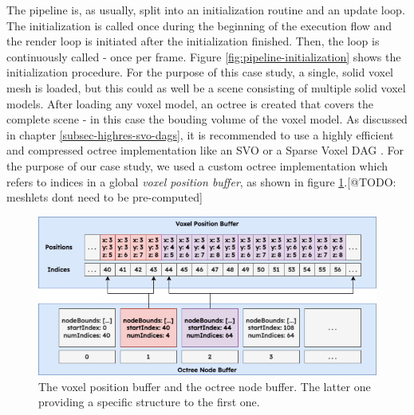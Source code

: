 The pipeline is, as usually, split into an initialization routine and an update loop. The initialization is 
called once during the beginning of the execution flow and the render loop is initiated after the initialization 
finished. Then, the loop is continuously called - once per frame. Figure \ref{fig:pipeline-initialization} shows 
the initialization procedure. For the purpose of this case study, a single, solid voxel mesh is loaded, but this 
could as well be a scene consisting of multiple solid voxel models. After loading any voxel model, an octree is 
created that covers the complete scene - in this case the bouding volume of the voxel model. As discussed in 
chapter \ref{subsec-highres-svo-dags}, it is recommended to use a highly efficient and compressed octree 
implementation like an \ac{SVO} or a Sparse Voxel \ac{DAG} \cite{Kampe2013}. For the purpose of our case study, 
we used a custom octree implementation which refers to indices in a global \emph{voxel position buffer}, as 
shown in figure \ref{fig:voxelpos-octreenode-buffer}.[@TODO: meshlets dont need to be pre-computed] \\

\begin{figure}[h]
    \centering
    \includegraphics[width=\linewidth]{images/graphics/voxelpos-octreenode-buffer.png}
    \caption{The voxel position buffer and the octree node buffer. The latter one providing a 
    specific structure to the first one.}
    \label{fig:voxelpos-octreenode-buffer}
\end{figure}

